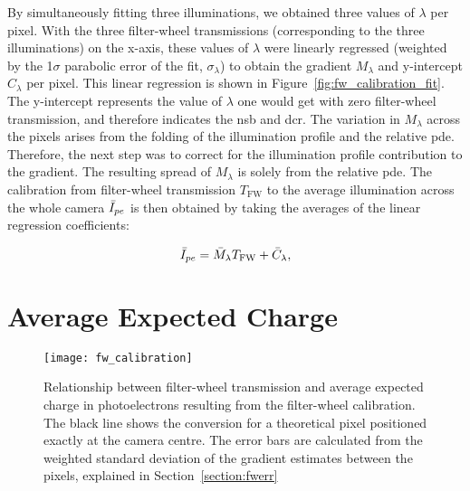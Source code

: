By simultaneously fitting three illuminations, we obtained three values of $\lambda$ per pixel. With the three filter-wheel transmissions (corresponding to the three illuminations) on the x-axis, these values of $\lambda$ were linearly regressed (weighted by the \si{1}{$\sigma$} parabolic error of the fit, $\sigma_\lambda$) to obtain the gradient $M_\lambda$ and y-intercept $C_\lambda$ per pixel. This linear regression is shown in Figure~\ref{fig:fw_calibration_fit}. The y-intercept represents the value of $\lambda$ one would get with zero filter-wheel transmission, and therefore indicates the \gls{nsb} and \gls{dcr}. The variation in $M_\lambda$ across the pixels arises from the folding of the illumination profile and the relative \gls{pde}. Therefore, the next step was to correct for the illumination profile contribution to the gradient. The resulting spread of $M_\lambda$ is solely from the relative \gls{pde}. The calibration from filter-wheel transmission $T_\text{FW}$ to the average illumination across the whole camera $\bar{I}_{pe}$ is then obtained by taking the averages of the linear regression coefficients:

\begin{equation} \label{eq:average_camera_illumination}
\bar{I}_{pe} = \bar{M}_\lambda T_\text{FW} + \bar{C}_\lambda,
\end{equation}

\section{Average Expected Charge}

\begin{figure}
	\centering
    \texttt{[image: fw\_calibration]} 
	\caption[Calibration from filter-wheel transmission to expected charge.]{Relationship between filter-wheel transmission and average expected charge in photoelectrons resulting from the filter-wheel calibration. The black line shows the conversion for a theoretical pixel positioned exactly at the camera centre. The error bars are calculated from the weighted standard deviation of the gradient estimates between the pixels, explained in Section~\ref{section:fwerr}}
	\label{fig:fw_calibration}
\end{figure}

